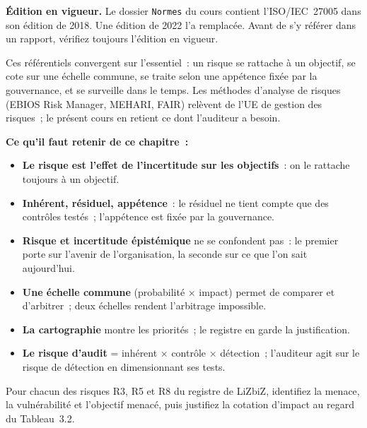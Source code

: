 \begin{boxinfo}
\textbf{Édition en vigueur.} Le dossier \texttt{Normes} du cours contient
l'ISO/IEC~27005 dans son édition de 2018. Une édition de 2022 l'a remplacée.
Avant de s'y référer dans un rapport, vérifiez toujours l'édition en
vigueur.
\end{boxinfo}

Ces référentiels convergent sur l'essentiel~: un risque se rattache à un
objectif, se cote sur une échelle commune, se traite selon une appétence
fixée par la gouvernance, et se surveille dans le temps. Les méthodes
d'analyse de risques (EBIOS Risk Manager, MEHARI, FAIR) relèvent de l'UE de
gestion des risques~; le présent cours en retient ce dont l'auditeur a
besoin.

\separateur

\begin{boxresume}
\textbf{Ce qu'il faut retenir de ce chapitre~:}
\begin{itemize}
    \item \textbf{Le risque est l'effet de l'incertitude sur les objectifs}~:
          on le rattache toujours à un objectif.
    \item \textbf{Inhérent, résiduel, appétence}~: le résiduel ne tient
          compte que des contrôles testés~; l'appétence est fixée par la
          gouvernance.
    \item \textbf{Risque et incertitude épistémique} ne se confondent pas~:
          le premier porte sur l'avenir de l'organisation, la seconde sur ce
          que l'on sait aujourd'hui.
    \item \textbf{Une échelle commune} (probabilité × impact) permet de
          comparer et d'arbitrer~; deux échelles rendent l'arbitrage
          impossible.
    \item \textbf{La cartographie} montre les priorités~; le registre en
          garde la justification.
    \item \textbf{Le risque d'audit} = inhérent × contrôle × détection~;
          l'auditeur agit sur le risque de détection en dimensionnant ses
          tests.
\end{itemize}
\end{boxresume}

\bigskip

\begin{boxexo}[title={\ding{45}\quad Exercice~3.1. Menace, vulnérabilité, impact \niveaubase}]
Pour chacun des risques R3, R5 et R8 du registre de LiZbiZ, identifiez la
menace, la vulnérabilité et l'objectif menacé, puis justifiez la cotation
d'impact au regard du Tableau~3.2.
\end{boxexo}

